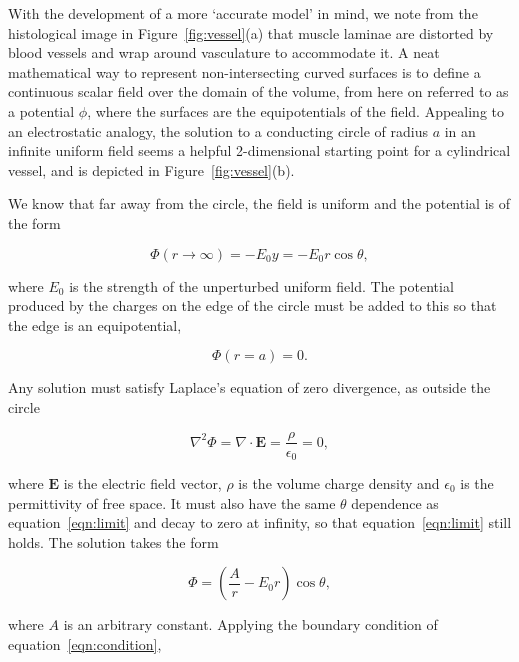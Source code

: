   With the development of a more `accurate model' in mind, we note from the histological image in Figure~\ref{fig:vessel}(a) that muscle laminae are distorted by blood vessels and wrap around vasculature to accommodate it. A neat mathematical way to represent non-intersecting curved surfaces is to define a continuous scalar field over the domain of the volume, from here on referred to as a potential $\phi$, where the surfaces are the equipotentials of the field. Appealing to an electrostatic analogy, the solution to a conducting circle of radius $a$ in an infinite uniform field seems a helpful 2-dimensional starting point for a cylindrical vessel, and is depicted in Figure~\ref{fig:vessel}(b).
  
  We know that far away from the circle, the field is uniform and the potential is of the form
  
  \begin{equation}
    \Phi(r\rightarrow\infty) = -E_0y = -E_0r\cos\theta,
    \label{eqn:limit}
  \end{equation}
  
  where $E_0$ is the strength of the unperturbed uniform field. The potential produced by the charges on the edge of the circle must be added to this so that the edge is an equipotential,
  
  \begin{equation}
    \Phi(r=a) = 0.
    \label{eqn:condition}
  \end{equation}
  
  Any solution must satisfy Laplace's equation of zero divergence, as outside the circle
  
  \begin{equation}
    \nabla^2\Phi = \nabla\cdot\mathbf{E} = \frac{\rho}{\epsilon_0} = 0,
  \end{equation}
  
  where $\mathbf{E}$ is the electric field vector, $\rho$ is the volume charge density and $\epsilon_0$ is the permittivity of free space. It must also have the same $\theta$ dependence as equation~\ref{eqn:limit} and decay to zero at infinity, so that equation~\ref{eqn:limit} still holds. The solution takes the form
  
  \begin{equation}
    \Phi = \left(\frac{A}{r} - E_0r\right)\cos\theta,
  \end{equation}
  
  where $A$ is an arbitrary constant. Applying the boundary condition of equation~\ref{eqn:condition},
  

